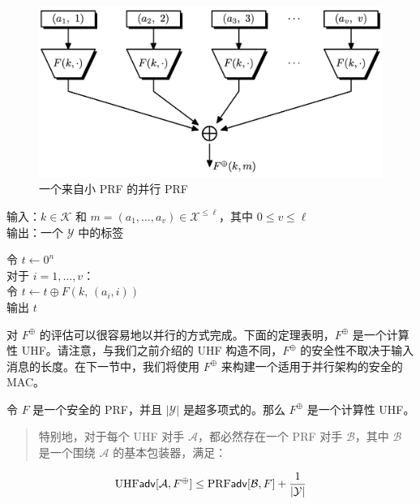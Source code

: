 \begin{figure}
  \centering
  \includegraphics[width=0.65\linewidth]{figures/chapter7/fig2.png}
  \caption{一个来自小 PRF 的并行 PRF}
  \label{fig:7-2}
\end{figure}

\vspace{5pt}

\hspace*{5pt} 输入：$k\in\mathcal{K}$ 和 $m=(a_1,\dots,a_v)\in\mathcal{X}^{\leq\ell}$，其中 $0\leq v\leq\ell$\\
\hspace*{26pt} 输出：一个 $\mathcal{Y}$ 中的标签

\vspace{5pt}

\hspace*{5pt} 令 $t\leftarrow0^n$\\
\hspace*{26pt} 对于 $i=1,\dots,v$：\\
\hspace*{50pt} 令 $t\leftarrow t\oplus F(k,\,(a_i,i))$\\
\hspace*{26pt} 输出 $t$

\vspace{5pt}

\noindent
对 $F^\oplus$ 的评估可以很容易地以并行的方式完成。下面的定理表明，$F^\oplus$ 是一个计算性 UHF。请注意，与我们之前介绍的 UHF 构造不同，$F^\oplus$ 的安全性不取决于输入消息的长度。在下一节中，我们将使用 $F^\oplus$ 来构建一个适用于并行架构的安全的 MAC。

\begin{theorem}\label{theo:7-6}
令 $F$ 是一个安全的 PRF，并且 $|\mathcal{Y}|$ 是超多项式的。那么 $F^\oplus$ 是一个计算性 UHF。
\begin{quote}
特别地，对于每个 UHF 对手 $\mathcal{A}$，都必然存在一个 PRF 对手 $\mathcal{B}$，其中 $\mathcal{B}$ 是一个围绕 $\mathcal{A}$ 的基本包装器，满足：
\end{quote}
\begin{equation}\label{eq:7-12}
{\rm UHF}\mathsf{adv}[\mathcal{A},F^\oplus]\leq{\rm PRF}\mathsf{adv}[\mathcal{B},F]+\frac{1}{|\mathcal{Y}|}
\end{equation}
\end{theorem}

